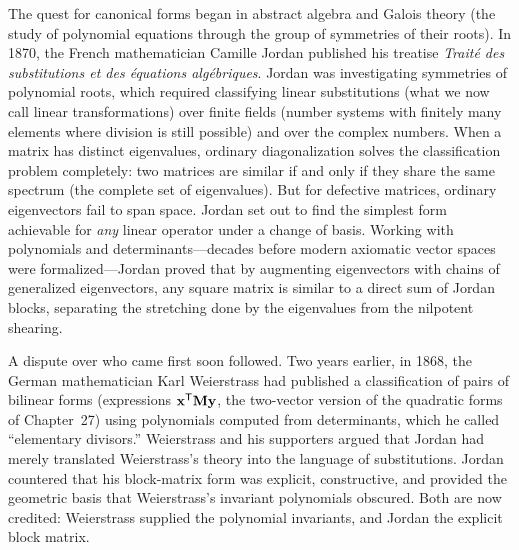 \begin{historybox}
The quest for canonical forms began in abstract algebra and Galois theory (the study of polynomial equations through the group of symmetries of their roots). In 1870, the French mathematician Camille Jordan published his treatise \emph{Trait\'e des substitutions et des \'equations alg\'ebriques}. Jordan was investigating symmetries of polynomial roots, which required classifying linear substitutions (what we now call linear transformations) over finite fields (number systems with finitely many elements where division is still possible) and over the complex numbers. When a matrix has distinct eigenvalues, ordinary diagonalization solves the classification problem completely: two matrices are similar if and only if they share the same spectrum (the complete set of eigenvalues). But for defective matrices, ordinary eigenvectors fail to span space. Jordan set out to find the simplest form achievable for \emph{any} linear operator under a change of basis. Working with polynomials and determinants---decades before modern axiomatic vector spaces were formalized---Jordan proved that by augmenting eigenvectors with chains of generalized eigenvectors, any square matrix is similar to a direct sum of Jordan blocks, separating the stretching done by the eigenvalues from the nilpotent shearing.

A dispute over who came first soon followed. Two years earlier, in 1868, the German mathematician Karl Weierstrass had published a classification of pairs of bilinear forms (expressions $\mathbf{x}^{\mathsf{T}}\mathbf{M}\mathbf{y}$, the two-vector version of the quadratic forms of Chapter~27) using polynomials computed from determinants, which he called ``elementary divisors.'' Weierstrass and his supporters argued that Jordan had merely translated Weierstrass's theory into the language of substitutions. Jordan countered that his block-matrix form was explicit, constructive, and provided the geometric basis that Weierstrass's invariant polynomials obscured. Both are now credited: Weierstrass supplied the polynomial invariants, and Jordan the explicit block matrix.


\end{historybox}
